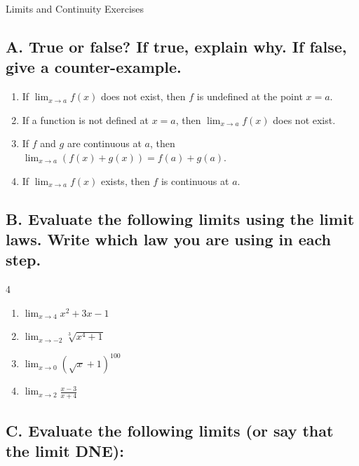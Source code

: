 \documentclass{article}
\begin{document}
\begin{center}
\begin{Huge}Limits and Continuity Exercises\end{Huge}
\end{center}


\subsection*{A. True or false? If true, explain why. If false, give a counter-example.}
\begin{enumerate}
\item If $\displaystyle\lim_{x\to a} f(x)$ does not exist, then $f$ is undefined at the point $x=a$.
\item If a function is not defined at $x=a$, then $\displaystyle\lim_{x\to a} f(x)$ does not exist.
\item If $f$ and $g$ are continuous at $a$, then $\displaystyle\lim_{x\to a} (f(x) + g(x))= f(a) + g(a).$
\item If $\displaystyle\lim_{x\to a} f(x)$ exists, then $f$ is continuous at $a$.
\end{enumerate}

\subsection*{B. Evaluate the following limits using the limit laws. Write which law you are using in each step.}
\begin{multicols}{4}
\begin{enumerate}
    \item $\displaystyle\lim_{x\to4}x^2+3x-1$
    \item $\displaystyle\lim_{x\to-2}\sqrt[3]{x^4+1}$
    \item $\displaystyle\lim_{x\to 0}\left(\sqrt{x}+1\right)^{100}$
    \item $\displaystyle\lim_{x\to2}\frac{x-3}{x+4}$
\end{enumerate}
\end{multicols}


\subsection*{C. Evaluate the following limits (or say that the limit DNE):}
\end{document}
